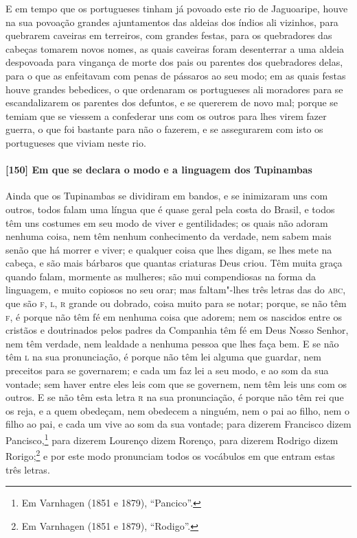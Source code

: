 E em tempo que os portugueses tinham já povoado este rio de Jaguoaripe, houve na sua
povoação grandes ajuntamentos das aldeias dos índios ali vizinhos, para quebrarem caveiras
em terreiros, com grandes festas, para os quebradores das cabeças tomarem novos nomes, as
quais caveiras foram desenterrar a uma aldeia despovoada para vingança de morte dos pais
ou parentes dos quebradores delas, para o que as enfeitavam com penas de pássaros ao seu
modo; em as quais festas houve grandes bebedices, o que ordenaram os portugueses ali
moradores para se escandalizarem os parentes dos defuntos, e se quererem de novo mal;
porque se temiam que se viessem a confederar uns com os outros para lhes virem fazer
guerra, o que foi bastante para não o fazerem, e se assegurarem com isto os portugueses
que viviam neste rio.

\paragraph{[150] Em que se declara o modo e a linguagem dos Tupinambas}\quad
Ainda que os Tupinambas se dividiram em bandos, e se inimizaram uns com outros, todos
falam uma língua que é quase geral pela costa do Brasil, e todos têm uns costumes em seu
modo de viver e gentilidades; os quais não adoram nenhuma coisa, nem têm nenhum
conhecimento da verdade, nem sabem mais senão que há morrer e viver; e qualquer coisa que
lhes digam, se lhes mete na cabeça, e são mais bárbaros que quantas criaturas Deus criou.
Têm muita graça quando falam, mormente as mulheres; são mui compendiosas na forma da
linguagem, e muito copiosos no seu orar; mas faltam"-lhes três letras das do \textsc{abc},
que são \textsc{f, l, r} grande ou dobrado, coisa muito para se notar; porque, se não têm
\textsc{f}, é porque não têm fé em nenhuma coisa que adorem; nem os nascidos entre os
cristãos e doutrinados pelos padres da Companhia têm fé em Deus Nosso Senhor, nem têm
verdade, nem lealdade a nenhuma pessoa que lhes faça bem. E se não têm \textsc{l} na sua
pronunciação, é porque não têm lei alguma que guardar, nem preceitos para se governarem; e
cada um faz lei a seu modo, e ao som da sua vontade; sem haver entre eles leis com que se
governem, nem têm leis uns com os outros. E se não têm esta letra \textsc{r} na sua
pronunciação, é porque não têm rei que os reja, e a quem obedeçam, nem obedecem a ninguém,
nem o pai ao filho, nem o filho ao pai, e cada um vive ao som da sua vontade; para dizerem
Francisco dizem Pancisco,\footnote{ Em Varnhagen (1851 e 1879), ``Pancico''.} para dizerem
Lourenço dizem Rorenço, para dizerem Rodrigo dizem Rorigo;\footnote{ Em Varnhagen (1851 e
1879), ``Rodigo''.} e por este modo pronunciam todos os vocábulos em que entram estas
três letras.

